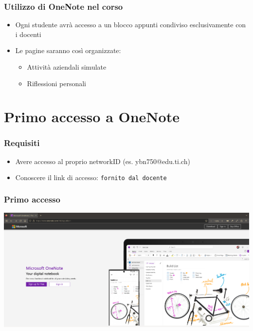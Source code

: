 \documentclass{beamer}
\begin{document}
\begin{frame}
  \frametitle{Utilizzo di OneNote nel corso}

  \begin{itemize}
    \item Ogni studente avrà accesso a un blocco appunti condiviso esclusivamente con i docenti
    \item Le pagine saranno così organizzate:
      \begin{itemize}
        \item Attività aziendali simulate
        \item Riflessioni personali
      \end{itemize}
  \end{itemize}
\end{frame}

\section{Primo accesso a OneNote}
\begin{frame}
  \frametitle{Requisiti}
  \begin{itemize}
  \item Avere accesso al proprio networkID (es. ybn750@edu.ti.ch)
  \item Conoscere il link di accesso: \texttt{fornito dal docente}
  \end{itemize}
\end{frame}

\begin{frame}
  \frametitle{Primo accesso}
  \begin{center}
    \includegraphics[width=0.8\linewidth]{images/1.png}
  \end{center}
\end{frame}
\end{document}
